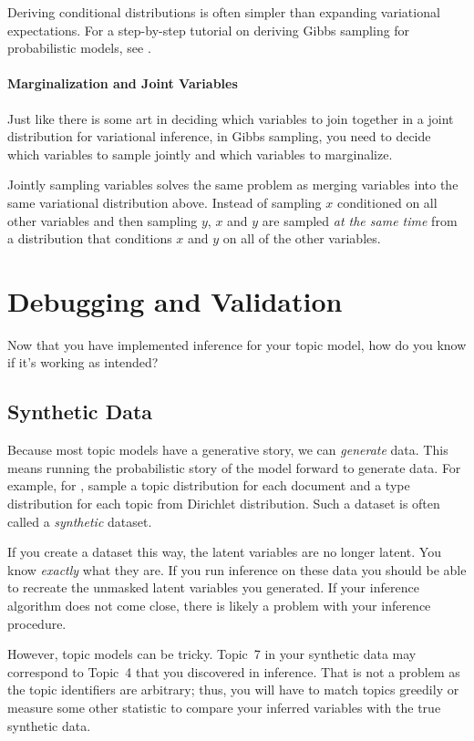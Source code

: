 Deriving conditional distributions is often simpler than expanding
variational expectations.  For a step-by-step tutorial on deriving
Gibbs sampling for probabilistic models, see \citet{hardisty-10}.

\paragraph{Marginalization and Joint Variables}

Just like there is some art in deciding which variables to join
together in a joint distribution for variational inference, in Gibbs
sampling, you need to decide which variables to sample jointly and
which variables to marginalize.

Jointly sampling variables solves the same problem as merging
variables into the same variational distribution above.  Instead of
sampling $x$ conditioned on all other variables and then sampling $y$,
$x$ and $y$ are sampled \emph{at the same time} from a distribution
that conditions $x$ and $y$ on all of the other variables.

\section{Debugging and Validation}

Now that you have implemented inference for your topic model, how do
you know if it's working as intended?

\subsection{Synthetic Data}

Because most topic models have a generative story, we can
\emph{generate} data.  This means running the probabilistic story of
the model forward to generate data.  For example, for ,
sample a topic distribution for each document and a type distribution
for each topic from Dirichlet distribution.  Such a dataset is often
called a \emph{synthetic} dataset.

If you create a dataset this way, the latent variables are no longer
latent.  You know \emph{exactly} what they are.  If you run inference
on these data you should be able to recreate the unmasked latent
variables you generated.  If your inference algorithm does not come
close, there is likely a problem with your inference procedure.

However, topic models can be tricky.  Topic~7 in your synthetic data
may correspond to Topic~4 that you discovered in inference.  That is
not a problem as the topic identifiers are arbitrary; thus, you will
have to match topics greedily or measure some other statistic to
compare your inferred variables with the true synthetic data.

